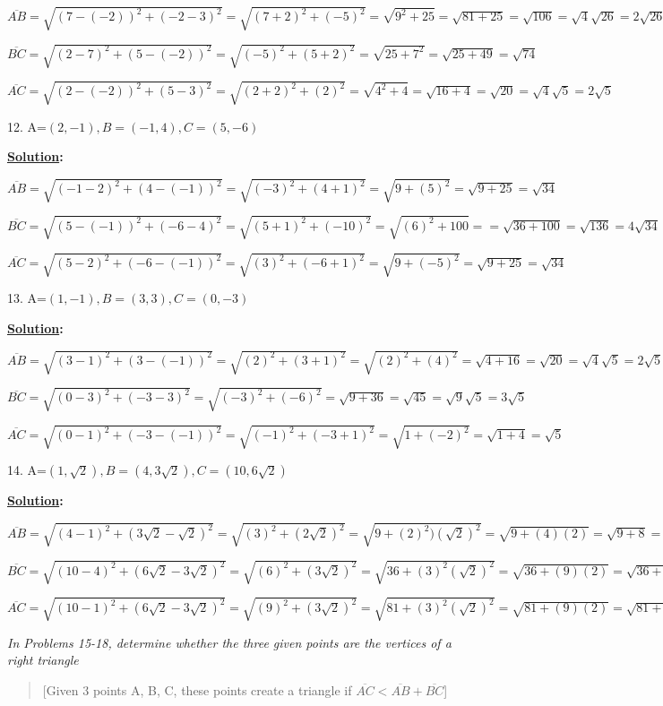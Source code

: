 \documentclass[10pt,letterpaper]{article}
\begin{document}
$\overline{AB} =\sqrt{(7-(-2))^2+(-2-3)^2}=\sqrt{(7+2)^2+(-5)^2}=\sqrt{9^2+25}=\sqrt{81+25}=\sqrt{106}=\sqrt{4}\sqrt{26}=2\sqrt{26}$

$\overline{BC} =\sqrt{(2-7)^2+(5-(-2))^2}=\sqrt{(-5)^2+(5+2)^2}=\sqrt{25+7^2}=\sqrt{25+49}=\sqrt{74}$

$\overline{AC} =\sqrt{(2-(-2))^2+(5-3)^2}=\sqrt{(2+2)^2+(2)^2}=\sqrt{4^2+4}=\sqrt{16+4}=\sqrt{20}=\sqrt{4}\sqrt{5}=2\sqrt{5}$


12. A=$(2, -1), B=(-1, 4), C=(5, -6)$

\textbf{\underline {Solution}:}

$\overline{AB} =\sqrt{(-1-2)^2+(4-(-1))^2}=\sqrt{(-3)^2+(4+1)^2}=\sqrt{9+(5)^2}=\sqrt{9+25}=\sqrt{34}$

$\overline{BC} =\sqrt{(5-(-1))^2+(-6-4)^2}=\sqrt{(5+1)^2+(-10)^2}=\sqrt{(6)^2+100}==\sqrt{36+100}=\sqrt{136}=4\sqrt{34}$

$\overline{AC} =\sqrt{(5-2)^2+(-6-(-1))^2}=\sqrt{(3)^2+(-6+1)^2}=\sqrt{9+(-5)^2}=\sqrt{9+25}=\sqrt{34}$


13. A=$(1, -1), B=(3, 3), C=(0, -3)$

\textbf{\underline {Solution}:}

$\overline{AB} =\sqrt{(3-1)^2+(3-(-1))^2}=\sqrt{(2)^2+(3+1)^2}=\sqrt{(2)^2+(4)^2}=\sqrt{4+16}=\sqrt{20}=\sqrt{4}\sqrt{5}=2\sqrt{5}$

$\overline{BC} =\sqrt{(0-3)^2+(-3-3)^2}=\sqrt{(-3)^2+(-6)^2}=\sqrt{9+36}=\sqrt{45}=\sqrt{9}\sqrt{5}=3\sqrt{5}$

$\overline{AC} =\sqrt{(0-1)^2+(-3-(-1))^2}=\sqrt{(-1)^2+(-3+1)^2}=\sqrt{1+(-2)^2}=\sqrt{1+4}=\sqrt{5}$


14. A=$(1, \sqrt{2}), B=(4, 3\sqrt{2}), C=(10, 6\sqrt{2})$

\textbf{\underline {Solution}:}

$\overline{AB} =\sqrt{(4-1)^2+(3\sqrt{2}-\sqrt{2})^2}=\sqrt{(3)^2+(2\sqrt{2})^2}=\sqrt{9+(2)^2)(\sqrt{2})^2}=\sqrt{9+(4)(2)}=\sqrt{9+8}=\sqrt{17}$

$\overline{BC} =\sqrt{(10-4)^2+(6\sqrt{2}-3\sqrt{2})^2}=\sqrt{(6)^2+(3\sqrt{2})^2}=\sqrt{36+(3)^2(\sqrt{2})^2}=\sqrt{36+(9)(2)}=\sqrt{36+18}=\sqrt{54}$

$\overline{AC} =\sqrt{(10-1)^2+(6\sqrt{2}-3\sqrt{2})^2}=\sqrt{(9)^2+(3\sqrt{2})^2}=\sqrt{81+(3)^2(\sqrt{2})^2}=\sqrt{81+(9)(2)}=\sqrt{81+18}=\sqrt{99}=\sqrt{9}\sqrt{11}=3\sqrt{11}$


\textit{In Problems 15-18, determine whether the three given points are the vertices of a right triangle}
\begin{quote}
{}[Given 3 points A, B, C, these points create a triangle if $\overline{AC} < \overline{AB}+\overline{BC}$]
\end{quote}
\end{document}
